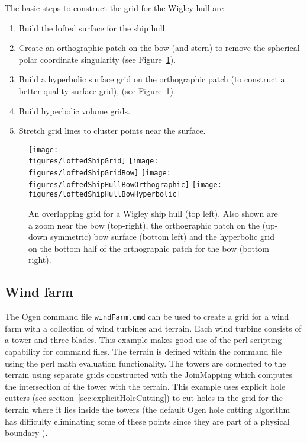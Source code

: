 \documentclass[xcolor=rgb,svgnames,dvipsnames]{article}
\newcommand{\figures}{../fig}
\begin{document}
The basic steps to construct the grid for the Wigley hull are
\begin{enumerate}
  \item Build the lofted surface for the ship hull.
  \item Create an orthographic patch on the bow (and stern) to remove the spherical polar coordinate singularity 
          (see Figure~\ref{fig:loftedShipHullGrid}).
  \item Build a hyperbolic surface grid on the orthographic patch (to construct a better quality surface grid), 
        (see Figure~\ref{fig:loftedShipHullGrid}).
  \item Build hyperbolic volume grids.
  \item Stretch grid lines to cluster points near the surface.
\end{enumerate}


\begin{figure}[htb]
  \begin{center}
   \texttt{[image: \\figures/loftedShipGrid]}
   \texttt{[image: \\figures/loftedShipGridBow]}
   \texttt{[image: \\figures/loftedShipHullBowOrthographic]}
   \texttt{[image: \\figures/loftedShipHullBowHyperbolic]}
  \caption{An overlapping grid for a Wigley ship hull (top left). Also shown are a zoom near the bow (top-right),
        the orthographic patch on the (up-down symmetric) bow surface (bottom left) and the hyperbolic grid on the bottom half of the 
         orthographic patch for the bow (bottom right).}
    \label{fig:loftedShipHullGrid}
  \end{center}
\end{figure}


\clearpage
\subsection{Wind farm}\label{sec:windFarm}


The Ogen command file {\tt windFarm.cmd} can be used to create a grid for a wind farm with 
a collection of wind turbines and terrain. Each wind turbine consists of a tower and
three blades. This example makes good use of the perl
scripting capability for command files. The terrain is defined within the command file
using the perl math evaluation functionality. 
The towers are connected to the terrain using separate grids constructed with the JoinMapping
which computes the intersection of the tower with the terrain. This example
uses explicit hole cutters (see section~\ref{sec:explicitHoleCutting}) to cut holes
in the grid for the terrain where it lies inside the towers (the default Ogen hole cutting
algorithm has difficulty eliminating some of these points since they are part of a physical
boundary ). 
\end{document}

